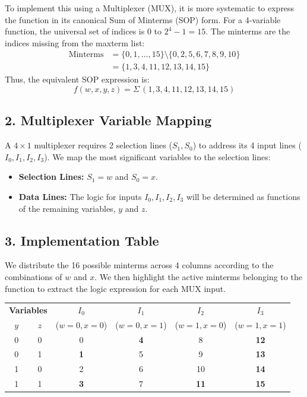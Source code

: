 \documentclass[12pt,a3paper]{article}
\begin{document}
\begin{enumerate}
\begin{tcolorbox}[enhanced,breakable,ansbox,colback=cD!4,colframe=cD,boxrule=0.8pt,arc=5pt,title={\textbf{Answer}},fonttitle=\bfseries\color{white},colbacktitle=cD]
To implement this using a Multiplexer (MUX), it is more systematic to express the function in its canonical Sum of Minterms (SOP) form. For a 4-variable function, the universal set of indices is $0$ to $2^4 - 1 = 15$. The minterms are the indices missing from the maxterm list:
\begin{align*}
    \text{Minterms} &= \{0, 1, \dots, 15\} \setminus \{0, 2, 5, 6, 7, 8, 9, 10\} \\
    &= \{1, 3, 4, 11, 12, 13, 14, 15\}
\end{align*}
Thus, the equivalent SOP expression is:
\[ f(w, x, y, z) = \Sigma\,(1, 3, 4, 11, 12, 13, 14, 15) \]

\vspace{0.2cm}
\subsection*{2. Multiplexer Variable Mapping}
A $4 \times 1$ multiplexer requires 2 selection lines ($S_1, S_0$) to address its 4 input lines ($I_0, I_1, I_2, I_3$). We map the most significant variables to the selection lines:
\begin{itemize}
    \item \textbf{Selection Lines:} $S_1 = w$ and $S_0 = x$.
    \item \textbf{Data Lines:} The logic for inputs $I_0, I_1, I_2, I_3$ will be determined as functions of the remaining variables, $y$ and $z$.
\end{itemize}

\vspace{0.2cm}
\subsection*{3. Implementation Table}
We distribute the 16 possible minterms across 4 columns according to the combinations of $w$ and $x$. We then highlight the active minterms belonging to the function to extract the logic expression for each MUX input.

\begin{center}
\renewcommand{\arraystretch}{1.3}
\begin{tabular}{c c | c | c | c | c}
\toprule
\multicolumn{2}{c|}{\textbf{Variables}} & \textbf{$I_0$} & \textbf{$I_1$} & \textbf{$I_2$} & \textbf{$I_3$} \\
$y$ & $z$ & ($w=0, x=0$) & ($w=0, x=1$) & ($w=1, x=0$) & ($w=1, x=1$) \\
\midrule
0 & 0 & 0 & \textcolor{cD}{\textbf{4}} & 8 & \textcolor{cD}{\textbf{12}} \\
0 & 1 & \textcolor{cD}{\textbf{1}} & 5 & 9 & \textcolor{cD}{\textbf{13}} \\
1 & 0 & 2 & 6 & 10 & \textcolor{cD}{\textbf{14}} \\
1 & 1 & \textcolor{cD}{\textbf{3}} & 7 & \textcolor{cD}{\textbf{11}} & \textcolor{cD}{\textbf{15}} \\
\bottomrule
\end{tabular}
\end{center}


\end{tcolorbox}
\end{enumerate}
\end{document}
